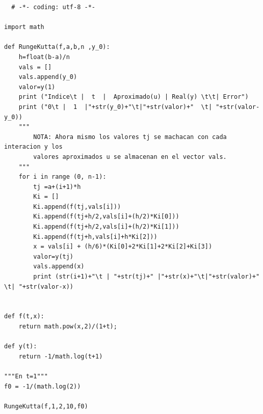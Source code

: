 \documentclass[11pt]{article}
\begin{document}
\begin{lstlisting}
  # -*- coding: utf-8 -*-

import math

def RungeKutta(f,a,b,n ,y_0):
    h=float(b-a)/n
    vals = []
    vals.append(y_0)
    valor=y(1)
    print ("Indice\t |  t  |  Aproximado(u) | Real(y) \t\t| Error")
    print ("0\t |  1  |"+str(y_0)+"\t|"+str(valor)+"  \t| "+str(valor-y_0))
    """
        NOTA: Ahora mismo los valores tj se machacan con cada interacion y los
        valores aproximados u se almacenan en el vector vals.
    """
    for i in range (0, n-1):
        tj =a+(i+1)*h
        Ki = []
        Ki.append(f(tj,vals[i]))
        Ki.append(f(tj+h/2,vals[i]+(h/2)*Ki[0]))
        Ki.append(f(tj+h/2,vals[i]+(h/2)*Ki[1]))
        Ki.append(f(tj+h,vals[i]+h*Ki[2]))
        x = vals[i] + (h/6)*(Ki[0]+2*Ki[1]+2*Ki[2]+Ki[3])
        valor=y(tj)
        vals.append(x)
        print (str(i+1)+"\t | "+str(tj)+" |"+str(x)+"\t|"+str(valor)+"  \t| "+str(valor-x))


def f(t,x):
    return math.pow(x,2)/(1+t);

def y(t):
    return -1/math.log(t+1)

"""En t=1"""
f0 = -1/(math.log(2))

RungeKutta(f,1,2,10,f0)
  \end{lstlisting}
\end{document}
